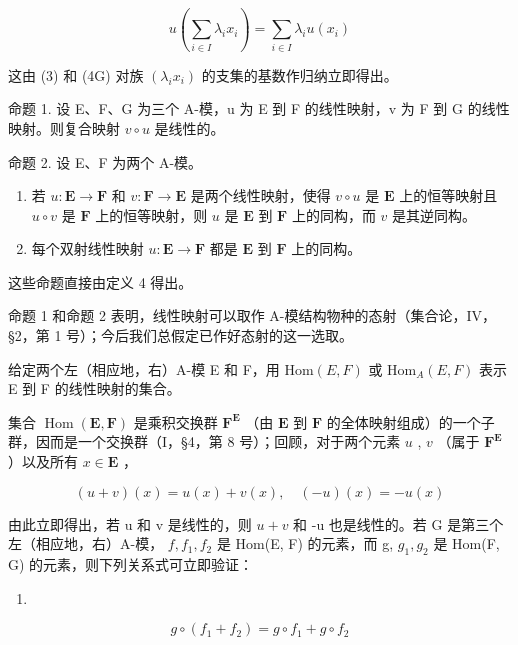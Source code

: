 \[
u \left(\sum_ {i \in I} \lambda_ {i} x _ {i}\right) = \sum_ {i \in I} \lambda_ {i} u (x _ {i})\tag{5}
\]

这由 (3) 和 (4G) 对族 \((\lambda_{i}x_{i})\) 的支集的基数作归纳立即得出。

命题 1. 设 E、F、G 为三个 A-模，u 为 E 到 F 的线性映射，v 为 F 到 G 的线性映射。则复合映射 \(v \circ u\) 是线性的。

命题 2. 设 E、F 为两个 A-模。

\begin{enumerate}
\def\labelenumi{(\arabic{enumi})}
\item
  若 \(u: \mathbf{E} \to \mathbf{F}\) 和 \(v: \mathbf{F} \to \mathbf{E}\) 是两个线性映射，使得 \(v \circ u\) 是 \(\mathbf{E}\) 上的恒等映射且 \(u \circ v\) 是 \(\mathbf{F}\) 上的恒等映射，则 \(u\) 是 \(\mathbf{E}\) 到 \(\mathbf{F}\) 上的同构，而 \(v\) 是其逆同构。
\item
  每个双射线性映射 \(u: \mathbf{E} \to \mathbf{F}\) 都是 \(\mathbf{E}\) 到 \(\mathbf{F}\) 上的同构。
\end{enumerate}

这些命题直接由定义 4 得出。

命题 1 和命题 2 表明，线性映射可以取作 A-模结构物种的态射（集合论，IV，§2，第 1 号）；今后我们总假定已作好态射的这一选取。

给定两个左（相应地，右）A-模 E 和 F，用 \(\text{Hom}(E, F)\) 或 \(\text{Hom}_{A}(E, F)\) 表示 E 到 F 的线性映射的集合。

集合 \(\operatorname{Hom}(\mathbf{E},\mathbf{F})\) 是乘积交换群 \(\mathbf{F}^{\mathbf{E}}\) （由 \(\mathbf{E}\) 到 \(\mathbf{F}\) 的全体映射组成）的一个子群，因而是一个交换群（I，§4，第 8 号）；回顾，对于两个元素 \(u\) , \(v\) （属于 \(\mathbf{F}^{\mathbf{E}}\) ）以及所有 \(x\in\mathbf{E}\) ，

\[
(u + v) (x) = u (x) + v (x), \quad (- u) (x) = - u (x)
\]

由此立即得出，若 u 和 v 是线性的，则 \(u + v\) 和 -u 也是线性的。若 G 是第三个左（相应地，右）A-模， \(f, f_{1}, f_{2}\) 是 Hom(E, F) 的元素，而 g, \(g_{1}, g_{2}\) 是 Hom(F, G) 的元素，则下列关系式可立即验证：

\begin{enumerate}
\def\labelenumi{(\arabic{enumi})}
\setcounter{enumi}{5}
\tightlist
\item
\end{enumerate}

\[
g \circ (f _ {1} + f _ {2}) = g \circ f _ {1} + g \circ f _ {2}\tag{7}
\]

